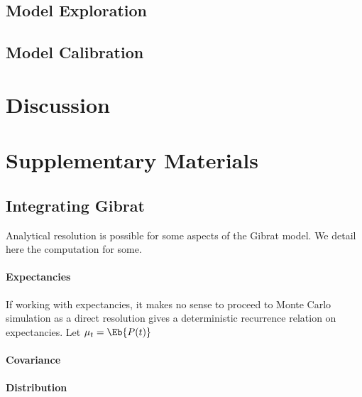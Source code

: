 \subsection{Model Exploration}



\subsection{Model Calibration}




\section{Discussion}







\section{Supplementary Materials}


\subsection{Integrating Gibrat}

Analytical resolution is possible for some aspects of the Gibrat model. We detail here the computation for some.

\paragraph{Expectancies} If working with expectancies, it makes no sense to proceed to Monte Carlo simulation as a direct resolution gives a deterministic recurrence relation on expectancies. Let $\mu_t = \Eb{P(t)}$

\paragraph{Covariance}


\paragraph{Distribution}



